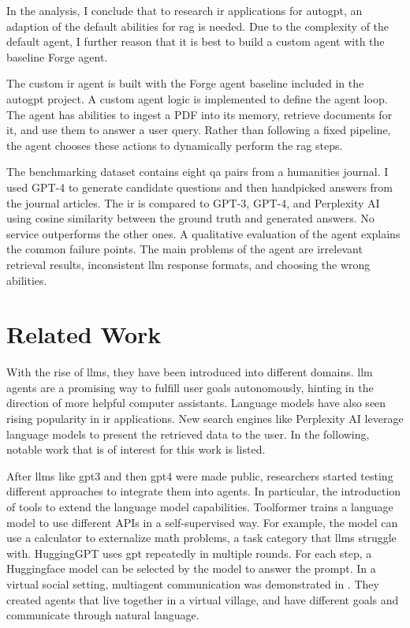 \documentclass[../main.tex]{subfiles}
\begin{document}
In the analysis, I conclude that to research \gls{ir} applications for \gls{autogpt},
an adaption of the default abilities for \gls{rag} is needed.
Due to the complexity of the default agent,
I further reason that it is best to build a custom agent with the baseline Forge agent.

The custom \gls{ir} agent is built with the Forge agent baseline included in the
\gls{autogpt} project.
A custom agent logic is implemented to define the agent loop.
The agent has abilities to ingest a PDF into its memory, retrieve documents for it,
and use them to answer a user query.
Rather than following a fixed pipeline, the agent chooses these actions to
dynamically perform the \gls{rag} steps.

The benchmarking dataset contains eight \gls{qa} pairs from a humanities journal.
I used GPT-4 to generate candidate questions and then handpicked answers from
the journal articles.
The \gls{ir} is compared to GPT-3, GPT-4, and Perplexity AI
using cosine similarity between the ground truth and generated answers.
No service outperforms the other ones.
A qualitative evaluation of the agent explains the common failure points.
The main problems of the agent are irrelevant retrieval results,
inconsistent \gls{llm} response formats, and choosing the wrong abilities.

\section{Related Work}

With the rise of \glspl{llm}, they have been introduced into different domains.
\Gls{llm} agents are a promising way to fulfill user goals autonomously,
hinting in the direction of more helpful computer assistants.
Language models have also seen rising popularity in \gls{ir} applications.
New search engines like Perplexity AI leverage language models
to present the retrieved data to the user.
In the following,
notable work that is of interest for this work is listed.

After \glspl{llm} like \gls{gpt3} and then \gls{gpt4} were made public,
researchers started testing different approaches to integrate them into agents.
In particular, the introduction of tools to extend the language model capabilities.
Toolformer \cite{Schick2023} trains a language model to use different APIs in a self-supervised way.
For example, the model can use a calculator to externalize math problems,
a task category that \glspl{llm} struggle with.
HuggingGPT \cite{Shen2023} uses \gls{gpt} repeatedly in multiple rounds.
For each step, a Huggingface model can be selected by the model to answer the prompt.
In a virtual social setting, multiagent communication was demonstrated in \autocite{Park2023}.
They created agents that live together in a virtual village,
and have different goals and communicate through natural language.
\end{document}

